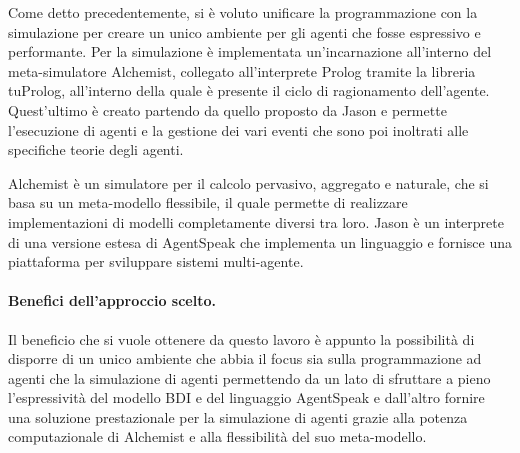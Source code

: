 Come detto precedentemente, si è voluto unificare la programmazione con la simulazione per creare un unico ambiente per gli agenti che fosse espressivo e performante. Per la simulazione è implementata un'incarnazione all'interno del meta-simulatore Alchemist, collegato all'interprete Prolog tramite la libreria tuProlog, all'interno della quale è presente il ciclo di ragionamento dell'agente.
Quest'ultimo è creato partendo da quello proposto da Jason e permette l'esecuzione di agenti e la gestione dei vari eventi che sono poi inoltrati alle specifiche teorie degli agenti.



Alchemist è un simulatore per il calcolo pervasivo, aggregato e naturale, che si basa su un meta-modello flessibile, il quale permette di realizzare implementazioni di modelli completamente diversi tra loro.
Jason è un interprete di una versione estesa di AgentSpeak che implementa un linguaggio e fornisce una piattaforma per sviluppare sistemi multi-agente.

\paragraph{Benefici dell'approccio scelto.}
Il beneficio che si vuole ottenere da questo lavoro è appunto la possibilità di disporre di un unico ambiente che abbia il focus sia sulla programmazione ad agenti che la simulazione di agenti permettendo da un lato di sfruttare a pieno l'espressività del modello BDI e del linguaggio AgentSpeak e dall'altro fornire una soluzione prestazionale per la simulazione di agenti grazie alla potenza computazionale di Alchemist e alla flessibilità del suo meta-modello.


